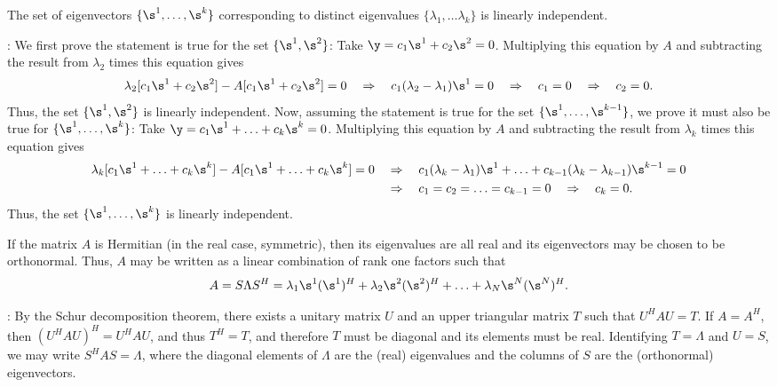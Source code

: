 \begin{fact} \label{fact.A.D.D.A}
The set of eigenvectors $\{\s^{1},\ldots,\s^{k}\}$ corresponding to
distinct eigenvalues $\{\lambda_{1},\ldots\lambda_{k}\}$ is linearly
independent.
\end{fact}

\/: We first prove the statement
is true for the set $\{\s^{1},\s^{2}\}$: Take
$\y=c_{1}\s^{1}+c_{2}\s^{2}=0$.  Multiplying this equation by $A$ and
subtracting the result from $\lambda_{2}$ times this equation gives
\begin{equation*}
    \lambda_{2}[c_{1}\s^{1}+c_{2}\s^{2}] - A[c_{1}\s^{1}+c_{2}\s^{2}] =0 \quad \Rightarrow \quad
    c_{1} (\lambda_{2}-\lambda_{1}) \s^{1} = 0 \quad \Rightarrow \quad c_{1}=0 \quad \Rightarrow \quad c_{2}=0.
\end{equation*}
Thus, the set $\{\s^{1},\s^{2}\}$ is linearly independent.  Now,
assuming the statement is true for the set
$\{\s^{1},\ldots,\s^{k-1}\}$, we prove it must also be true for
$\{\s^{1},\ldots,\s^{k}\}$: Take
$\y=c_{1}\s^{1}+\ldots+c_{k}\s^{k}=0$.  Multiplying this equation by
$A$ and subtracting the result from $\lambda_{k}$ times this equation
gives
\begin{align*}
    \lambda_{k}[c_{1}\s^{1}+\ldots+c_{k}\s^{k}] -
    A[c_{1}\s^{1}+\ldots+c_{k}\s^{k}] =0 \quad &\Rightarrow \quad c_{1}
    (\lambda_{k}-\lambda_{1}) \s^{1} + \ldots + c_{k-1}
    (\lambda_{k}-\lambda_{k-1}) \s^{k-1} = 0 \\ &\Rightarrow \quad
    c_{1}=c_{2}=\ldots=c_{k-1}=0 \quad \Rightarrow \quad c_{k}=0.
\end{align*}
Thus, the set $\{\s^{1},\ldots,\s^{k}\}$ is linearly independent. \endproof

\begin{fact} \label{fact.A.D.D.B}
If the matrix $A$ is Hermitian (in the real case,
symmetric), then its eigenvalues are all real and its eigenvectors may be
chosen to be orthonormal.  Thus, $A$ may be written as a linear combination of rank one
factors such that
\begin{equation*}
A=S\Lambda S^H = \lambda_1 \s^1 (\s^1)^H + \lambda_2 \s^2 (\s^2)^H + \ldots + \lambda_N \s^N (\s^N)^H.
\end{equation*}
\end{fact}

\/: By the Schur decomposition theorem, there
exists a unitary matrix $U$ and an upper triangular matrix $T$ such
that $U^{H}AU=T$.  If $A=A^{H}$, then $(U^{H}AU)^{H}=U^{H}AU$, and
thus $T^{H}=T$, and therefore $T$ must be diagonal and its elements
must be real.  Identifying $T=\Lambda$ and $U=S$, we may write
$S^{H}A S=\Lambda$, where the diagonal elements of $\Lambda$ are the
(real) eigenvalues and the columns of $S$ are the (orthonormal)
eigenvectors.   \endproof

